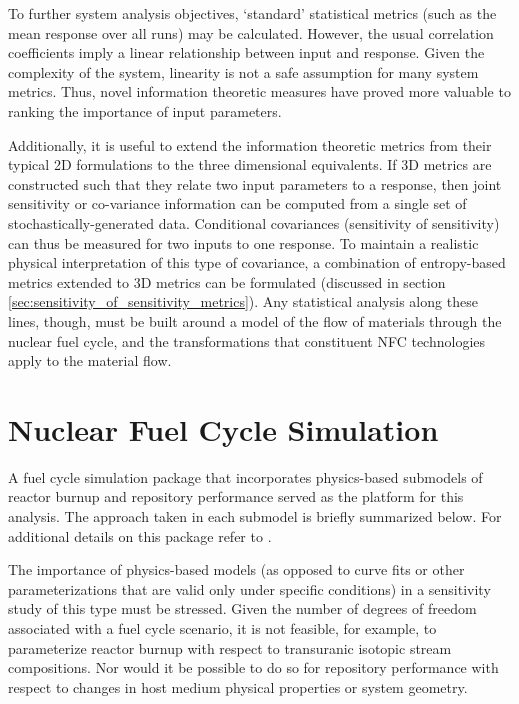 To further system analysis objectives, `standard' statistical metrics (such as the mean response
over all runs) may be calculated.  However, the usual correlation coefficients imply a linear
relationship between input and response.  Given the complexity of the system, linearity is not
a safe assumption for many system metrics.  Thus, novel information theoretic measures have
proved more valuable to ranking the importance of input parameters.

Additionally, it is useful to extend the information theoretic metrics from their typical 2D
formulations to the three dimensional equivalents.  If 3D metrics are constructed such that
they relate two input parameters to a response, then joint sensitivity or co-variance information
can be computed from a single set of stochastically-generated data.  Conditional covariances
(sensitivity of sensitivity) can thus be measured for two inputs to one response.
To maintain a realistic physical interpretation of this type of covariance, a combination of
entropy-based metrics extended to 3D metrics can be formulated  (discussed in section
\ref{sec:sensitivity_of_sensitivity_metrics}).  Any statistical analysis along these lines, though,
must be built around a model of the flow of materials through the nuclear fuel cycle, and the
transformations that constituent NFC technologies apply to the material flow.




\section{Nuclear Fuel Cycle Simulation}
\label{cts_sec:nfcsim}

A fuel cycle simulation package that incorporates physics-based submodels of reactor burnup \cite{Scopatz2009} and
repository performance \cite{Li2009} served as the platform for this analysis. The approach taken in each
submodel is briefly summarized below. For additional details on this package refer to \cite{Li2009b}.

The importance of physics-based models (as opposed to curve fits or other parameterizations that are valid
only under specific conditions) in a sensitivity study of this type must be stressed. Given the number of
degrees of freedom associated with a fuel cycle scenario, it is not feasible, for example, to parameterize
reactor burnup with respect to transuranic isotopic stream compositions. Nor would it be possible to do
so for repository performance with respect to changes in host medium physical properties or system
geometry.

